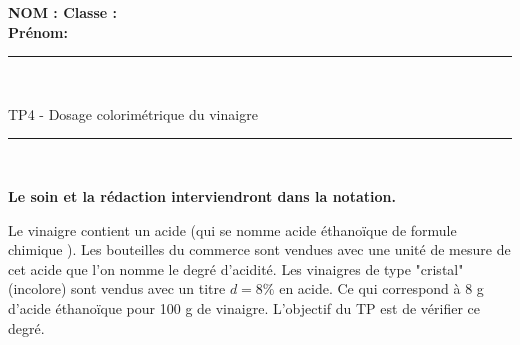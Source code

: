 \documentclass[11pt,a4paper]{article}
\begin{document}

\flushleft \textbf{NOM : \hfill Classe : \hspace{3cm} ~~\\[2mm]
Prénom:\\[0,4cm]
}
\hrule\
\\[0,2cm]

\begin{center}
 \LARGE{TP4 - Dosage colorimétrique du vinaigre    }
\end{center}

\vspace{3 mm}

\normalsize

\hrule\
\\[0,2cm]
   \begin{center}
   \textbf{Le soin et la rédaction interviendront dans la notation.}
   \end{center} 

Le vinaigre contient un acide (qui se nomme acide éthanoïque de formule chimique ). Les bouteilles du commerce sont vendues avec une unité de mesure de cet acide que l'on nomme le degré d'acidité. Les vinaigres de type "cristal" (incolore) sont vendus avec un titre $d=8\%$ en acide. Ce qui correspond à 8 g d'acide éthanoïque pour 100 g de vinaigre. L'objectif du TP est de vérifier ce degré. \\


\vspace{0.5cm}
\end{document}
